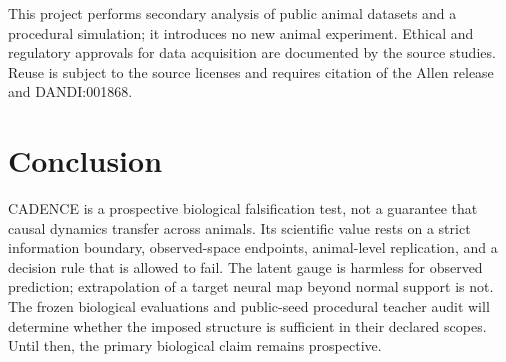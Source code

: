 \documentclass[11pt]{article}
\begin{document}
This project performs secondary analysis of public animal datasets and a
procedural simulation; it introduces no new animal experiment. Ethical and
regulatory approvals for data acquisition are documented by the source
studies. Reuse is subject to the source licenses and requires citation of the
Allen release and DANDI:001868.

\section{Conclusion}

CADENCE is a prospective biological falsification test, not a guarantee that causal
dynamics transfer across animals. Its scientific value rests on a strict
information boundary, observed-space endpoints, animal-level replication, and
a decision rule that is allowed to fail. The latent gauge is harmless for
observed prediction; extrapolation of a target neural map beyond normal support
is not. The frozen biological evaluations and public-seed procedural teacher
audit will determine whether the imposed structure is sufficient in their
declared scopes. Until then, the primary biological claim remains prospective.



\end{document}

